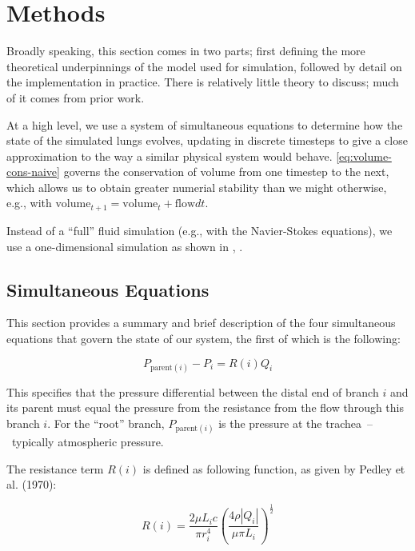%
\section{Methods}

Broadly speaking, this section comes in two parts; first defining the more theoretical underpinnings
of the model used for simulation, followed by detail on the implementation in practice. There is
relatively little theory to discuss; much of it comes from prior work.\cite{Foy2018}

At a high level, we use a system of simultaneous equations to determine how the state of the
simulated lungs evolves, updating in discrete timesteps to give a close approximation to the way a
similar physical system would behave. \autoref{eq:volume-cons-naive} governs the
conservation of volume from one timestep to the next, which allows us to obtain greater numerial
stability than we might otherwise, e.g., with
$\text{volume}_{t+1} = \text{volume}_t + \text{flow} dt$.

Instead of a ``full'' fluid simulation (e.g., with the Navier-Stokes equations), we use a
one-dimensional simulation as shown in \citeauthor{Foy2018}, \citeyear{Foy2018}.

\subsection{Simultaneous Equations}

This section provides a summary and brief description of the four simultaneous equations that govern
the state of our system, the first of which is the following:

\begin{equation}
    P_{\text{parent}(i)} - P_i = R(i) Q_i
\end{equation}

\noindent
This specifies that the pressure differential between the distal end of branch $i$ and its parent
must equal the pressure from the resistance from the flow through this branch $i$. For the ``root''
branch, $P_{\text{parent}(i)}$ is the pressure at the trachea~--~typically atmospheric pressure.

The resistance term $R(i)$ is defined as following function, as given by Pedley et al. (1970):

\begin{equation*}
    R(i) = \frac{2 \mu L_i c}{\pi r_i^4} \left( \frac{4 \rho |Q_i|}{\mu \pi L_i} \right)^{\frac{1}{2}}
\end{equation*}


